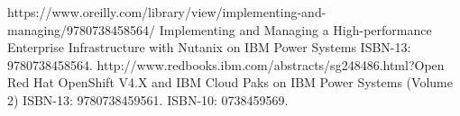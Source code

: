 %
%
%


\begin{publications}
    \publication
        {https://www.oreilly.com/library/view/implementing-and-managing/9780738458564/}
        {Implementing and Managing a High-performance Enterprise Infrastructure with Nutanix on IBM Power Systems}
        ISBN-13: 9780738458564.
        \newline
    \publication
        {http://www.redbooks.ibm.com/abstracts/sg248486.html?Open}
        {Red Hat OpenShift V4.X and IBM Cloud Paks on IBM Power Systems (Volume 2)}
        ISBN-13: 9780738459561. ISBN-10: 0738459569.
        \newline
\end{publications}